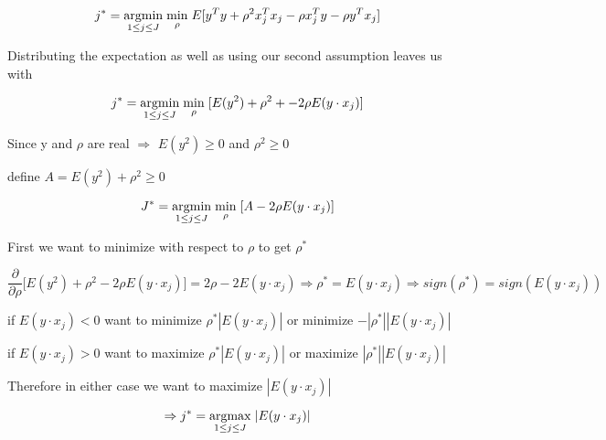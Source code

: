 \documentclass[11pt]{article}
\begin{document}
$$j^* = \underset{1 \leq j \leq J}{\operatorname{argmin}} \hspace{1mm} \underset{\rho}{\operatorname{min}} \hspace{1mm} E[y^Ty + \rho^2 x_j^T x_j - \rho x_j^T y - \rho y^T x_j]$$ 

Distributing the expectation as well as using our second assumption leaves us with

$$j^* = \underset{1 \leq j \leq J}{\operatorname{argmin}} \hspace{1mm} \underset{\rho}{\operatorname{min}} \hspace{1mm} [E(y^2) + \rho^2 + -2 \rho E(y \cdot x_j)]$$

Since y and $\rho$ are real $\Rightarrow$ $E(y^2) \geq 0$ and $\rho^2 \geq 0$ 

define $A = E(y^2) + \rho^2 \geq 0$

$$J^* = \underset{1 \leq j \leq J}{\operatorname{argmin}} \hspace{1mm} \underset{\rho}{\operatorname{min}} \hspace{1mm} [A - 2 \rho E(y \cdot x_j)]$$

First we want to minimize with respect to $\rho$ to get $\rho^*$

$$\frac{\partial}{\partial \rho} \bigg[ E(y^2) + \rho^2 - 2 \rho E(y \cdot x_j) \bigg] = 2 \rho - 2 E(y \cdot x_j) \Rightarrow \rho^* = E(y \cdot x_j) \Rightarrow sign(\rho^*) = sign(E(y \cdot x_j))$$ 

if $E(y \cdot x_j) < 0$ want to minimize $\rho^* |E(y \cdot x_j)|$ or minimize $- |\rho^*| |E(y \cdot x_j)|$

if $E(y \cdot x_j) > 0$ want to maximize $\rho^* |E(y \cdot x_j)|$ or maximize $ |\rho^*| |E(y \cdot x_j)|$

Therefore in either case we want to maximize $|E(y \cdot x_j)|$

$$ \Rightarrow j^* = \underset{1 \leq j \leq J}{\operatorname{argmax}}\hspace{1mm} |E(y \cdot x_j)|$$
\end{document}
